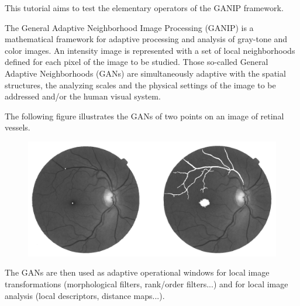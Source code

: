 \def\difficulty{3}

\begin{note}This tutorial aims to test the elementary operators of the GANIP framework.

The General Adaptive Neighborhood Image Processing (GANIP) is a mathematical framework for adaptive processing and analysis of gray-tone and color images. An intensity image is represented with a set of local neighborhoods defined for each pixel of the image to be studied. Those so-called General Adaptive Neighborhoods (GANs) are simultaneously adaptive with the spatial structures, the analyzing scales and the physical settings of the image to be addressed and/or the human visual system.
\end{note}


The following figure illustrates the GANs of two points on an image of retinal vessels.

{
	\makeatletter
	\renewcommand\fs@ruled{\def\@fs@cfont{\bfseries}\let\@fs@capt\floatc@ruled
		\def\@fs@pre{\hrule height.8pt depth0pt \kern2pt}%
		\def\@fs@post{\kern2pt\hrule\relax}%
		\def\@fs@mid{\vskip2pt}%
		\let\@fs@iftopcapt\iftrue}
	\makeatother
\begin{figure}[htbp]
\centering
\includegraphics[width=.7\linewidth]{retinaGAN.png}
\end{figure}
}

The GANs are then used as adaptive operational windows for local image transformations (morphological filters, rank/order filters...) and for local image analysis (local descriptors, distance maps...).


